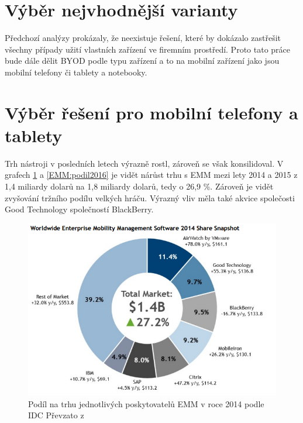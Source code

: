 \section{Výběr nejvhodnější varianty}

Předchozí analýzy prokázaly, že neexistuje řešení, které by dokázalo zastřešit všechny případy užití vlastních zařízení ve firemním prostředí. Proto tato práce bude dále dělit BYOD podle typu zařízení a to na mobilní zařízení jako jsou mobilní telefony či tablety a notebooky.

\section{Výběr řešení pro mobilní telefony a tablety}


Trh nástroji v posledních letech výrazně rostl, zároveň se však konsilidoval.  V grafech \ref{EMM:podil2015} a \ref{EMM:podil2016} je vidět nárůst trhu s EMM mezi lety 2014 a 2015 z 1,4 miliardy dolarů na 1,8 miliardy dolarů, tedy o 26,9 \%. Zároveň je vidět zvyšování tržního podílu velkých hráču. Výrazný vliv měla také akvice společosti Good Technology společností BlackBerry.

 
  \begin{figure}[h!]
\includegraphics[width=13cm]{img/IDC_EMM}
\caption{Podíl na trhu jednotlivých poskytovatelů EMM v roce 2014 podle IDC Převzato z \cite{}} 
\label{EMM:podil2015}
\centering
\end{figure}

